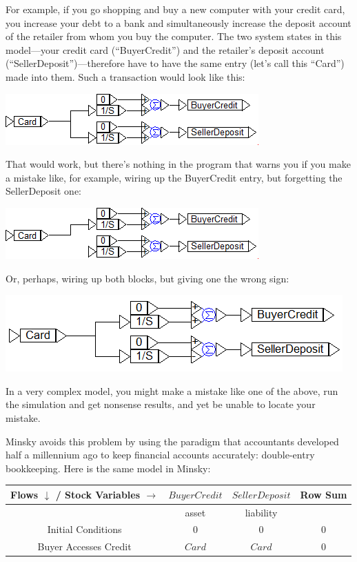 For example, if you go shopping and buy a new computer with your credit
card, you increase your debt to a bank and simultaneously increase
the deposit account of the retailer from whom you buy the computer.
The two system states in this model---your credit card (``BuyerCredit'')
and the retailer's deposit account (``SellerDeposit'')---therefore
have to have the same entry (let's call this ``Card'') made into
them. Such a transaction would look like this:
\begin{center}
\includegraphics{images/NewItem11} 
\par\end{center}

That would work, but there's nothing in the program that warns you
if you make a mistake like, for example, wiring up the BuyerCredit
entry, but forgetting the SellerDeposit one:
\begin{center}
\includegraphics{images/NewItem12} 
\par\end{center}

Or, perhaps, wiring up both blocks, but giving one the wrong sign:
\begin{center}
\includegraphics{images/NewItem51} 
\par\end{center}

In a very complex model, you might make a mistake like one of the
above, run the simulation and get nonsense results, and yet be unable
to locate your mistake.

Minsky avoids this problem by using the paradigm that accountants
developed half a millennium ago to keep financial accounts accurately:
double-entry bookkeeping. Here is the same model in Minsky:
\begin{center}
\begin{tabular}{|c|c||c|c|}
\hline 
Flows $\downarrow$ / Stock Variables $\rightarrow$ & \multicolumn{1}{c||}{$BuyerCredit$} & \multicolumn{1}{c|}{$SellerDeposit$} & Row Sum\tabularnewline
\hline 
 & \multicolumn{1}{c||}{asset} & \multicolumn{1}{c|}{liability} & \tabularnewline
\hline 
Initial Conditions & \multicolumn{1}{c}{$0$} & $0$ & 0\tabularnewline
Buyer Accesses Credit & \multicolumn{1}{c}{$Card$} & $Card$ & 0\tabularnewline
\hline 
\end{tabular}
\par\end{center}

